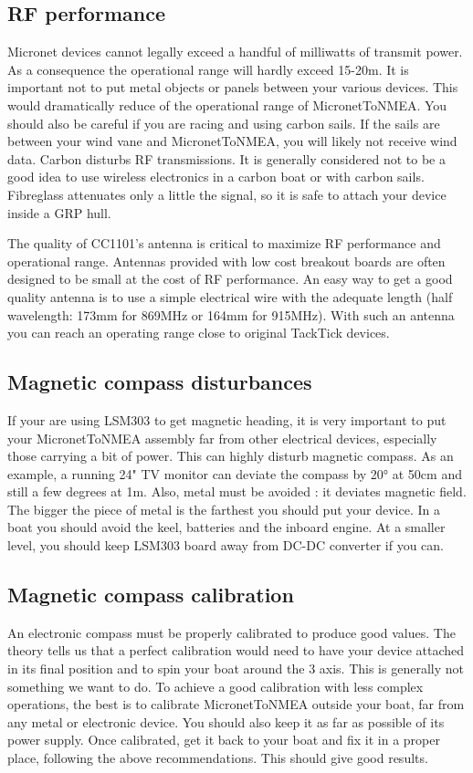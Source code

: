 \documentclass{report}
\begin{document}
\subsection{RF performance}
Micronet devices cannot legally exceed a handful of milliwatts of transmit power. As a consequence the operational range will hardly exceed 15-20m. It is important not to put metal objects or panels between your various devices. This would dramatically reduce of the operational range of MicronetToNMEA.
You should also be careful if you are racing and using carbon sails. If the sails are between your wind vane and MicronetToNMEA, you will likely not receive wind data. Carbon disturbs RF transmissions.
It is generally considered not to be a good idea to use wireless electronics in a carbon boat or with carbon sails. Fibreglass attenuates only a little the signal, so it is safe to attach your device inside a GRP hull.

The quality of CC1101's antenna is critical to maximize RF performance and operational range. Antennas provided with low cost breakout boards are often designed to be small at the cost of RF performance. An easy way to get a good quality antenna is to use a simple electrical wire with the adequate length (half wavelength: 173mm for 869MHz or 164mm for 915MHz). With such an antenna you can reach an operating range close to original TackTick devices.

\subsection{Magnetic compass disturbances}
\label{compass-recommendations}
If your are using LSM303 to get magnetic heading, it is very important to put your MicronetToNMEA assembly far from other electrical devices, especially those carrying a bit of power. This can highly disturb magnetic compass. As an example, a running 24" TV monitor can deviate the compass by 20° at 50cm and still a few degrees at 1m.
Also, metal must be avoided : it deviates magnetic field. The bigger the piece of metal is the farthest you should put your device. In a boat you should avoid the keel, batteries and the inboard engine. At a smaller level, you should keep LSM303 board away from DC-DC converter if you can.

\subsection{Magnetic compass calibration}
An electronic compass must be properly calibrated to produce good values. The theory tells us that a perfect calibration would need to have your device attached in its final position and to spin your boat around the 3 axis. This is generally not something we want to do. To achieve a good calibration with less complex operations, the best is to calibrate MicronetToNMEA outside your boat, far from any metal or electronic device. You should also keep it as far as possible of its power supply. Once calibrated, get it back to your boat and fix it in a proper place, following the above recommendations. This should give good results.
\end{document}
